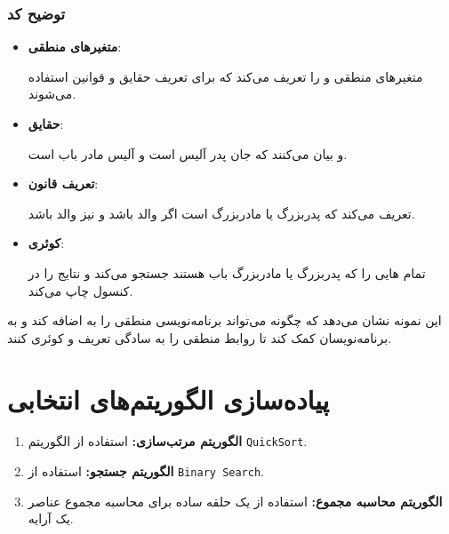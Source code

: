 \documentclass[12pt, a4paper]{report}
\begin{document}
	\subsection{توضیح کد}
	\begin{itemize}
		\item \textbf{متغیرهای منطقی}:  
		
		 متغیرهای منطقی  و  را تعریف می‌کند که برای تعریف حقایق و قوانین استفاده می‌شوند.
		
		\item \textbf{حقایق}:  
		
		 و  بیان می‌کنند که جان پدر آلیس است و آلیس مادر باب است.
		
		\item \textbf{تعریف قانون}:
		  
		 تعریف می‌کند که  پدربزرگ یا مادربزرگ  است اگر  والد  باشد و  نیز والد  باشد.
		
		\item \textbf{کوئری}:  
		
		 تمام هایی را که پدربزرگ یا مادربزرگ باب هستند جستجو می‌کند و نتایج را در کنسول چاپ می‌کند.
	\end{itemize}
	
	این نمونه نشان می‌دهد که چگونه  می‌تواند برنامه‌نویسی منطقی را به  اضافه کند و به برنامه‌نویسان کمک کند تا روابط منطقی را به سادگی تعریف و کوئری کنند.
	


\chapter{پیاده‌سازی الگوریتم‌های انتخابی}
\begin{enumerate}
	\item \textbf{الگوریتم مرتب‌سازی:} استفاده از الگوریتم \texttt{QuickSort}.
	\item \textbf{الگوریتم جستجو:} استفاده از \texttt{Binary Search}.
	\item \textbf{الگوریتم محاسبه مجموع:} استفاده از یک حلقه ساده برای محاسبه مجموع عناصر یک آرایه.
\end{enumerate}
\end{document}

